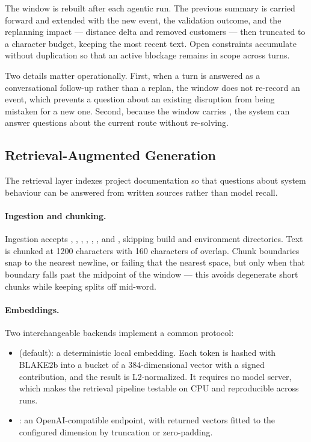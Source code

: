 \documentclass[11pt,a4paper]{article}
\begin{document}
The window is rebuilt after each agentic run. The previous summary is carried forward and extended
with the new event, the validation outcome, and the replanning impact --- distance delta and removed
customers --- then truncated to a character budget, keeping the most recent text. Open constraints
accumulate without duplication so that an active blockage remains in scope across turns.

Two details matter operationally. First, when a turn is answered as a conversational follow-up rather
than a replan, the window does not re-record an event, which prevents a question about an existing
disruption from being mistaken for a new one. Second, because the window carries ,
the system can answer questions about the current route without re-solving.

\subsection{Retrieval-Augmented Generation}

The retrieval layer indexes project documentation so that questions about system behaviour can be
answered from written sources rather than model recall.

\paragraph{Ingestion and chunking.}
Ingestion accepts , , , , , ,
 and , skipping build and environment directories. Text is chunked at 1200
characters with 160 characters of overlap. Chunk boundaries snap to the nearest newline, or failing
that the nearest space, but only when that boundary falls past the midpoint of the window --- this
avoids degenerate short chunks while keeping splits off mid-word.

\paragraph{Embeddings.}
Two interchangeable backends implement a common  protocol:

\begin{itemize}
  \item {} (default): a deterministic local embedding. Each token is hashed with BLAKE2b
        into a bucket of a 384-dimensional vector with a signed contribution, and the result is
        L2-normalized. It requires no model server, which makes the retrieval pipeline testable on
        CPU and reproducible across runs.
  \item {}: an OpenAI-compatible  endpoint, with returned vectors fitted to
        the configured dimension by truncation or zero-padding.
\end{itemize}
\end{document}
